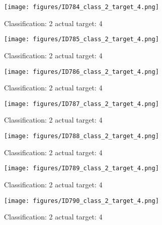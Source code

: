 \begin{figure}[h!]
\begin{center}
\texttt{[image: figures/ID784\_class\_2\_target\_4.png]}
\end{center}
\caption{ Classification: 2 actual target: 4}
\label{fig:ID784_class_2_target_4}
\end{figure}
\begin{figure}[h!]
\begin{center}
\texttt{[image: figures/ID785\_class\_2\_target\_4.png]}
\end{center}
\caption{ Classification: 2 actual target: 4}
\label{fig:ID785_class_2_target_4}
\end{figure}
\begin{figure}[h!]
\begin{center}
\texttt{[image: figures/ID786\_class\_2\_target\_4.png]}
\end{center}
\caption{ Classification: 2 actual target: 4}
\label{fig:ID786_class_2_target_4}
\end{figure}
\begin{figure}[h!]
\begin{center}
\texttt{[image: figures/ID787\_class\_2\_target\_4.png]}
\end{center}
\caption{ Classification: 2 actual target: 4}
\label{fig:ID787_class_2_target_4}
\end{figure}
\begin{figure}[h!]
\begin{center}
\texttt{[image: figures/ID788\_class\_2\_target\_4.png]}
\end{center}
\caption{ Classification: 2 actual target: 4}
\label{fig:ID788_class_2_target_4}
\end{figure}
\begin{figure}[h!]
\begin{center}
\texttt{[image: figures/ID789\_class\_2\_target\_4.png]}
\end{center}
\caption{ Classification: 2 actual target: 4}
\label{fig:ID789_class_2_target_4}
\end{figure}
\begin{figure}[h!]
\begin{center}
\texttt{[image: figures/ID790\_class\_2\_target\_4.png]}
\end{center}
\caption{ Classification: 2 actual target: 4}
\label{fig:ID790_class_2_target_4}
\end{figure}

